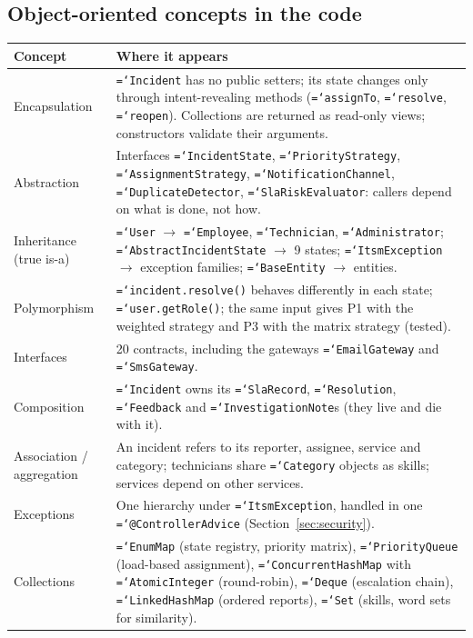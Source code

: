 \documentclass[11pt,a4paper]{article}
\newcommand{\code}[1]{\texttt{\hyphenchar\font=`\-\relax #1}}
\begin{document}
\subsection{Object-oriented concepts in the code}
\begin{longtable}{@{}L{3.1cm}L{12.1cm}@{}}
\toprule
\textbf{Concept} & \textbf{Where it appears} \\
\midrule\endhead
Encapsulation & \code{Incident} has no public setters; its state changes only through intent-revealing methods (\code{assignTo}, \code{resolve}, \code{reopen}). Collections are returned as read-only views; constructors validate their arguments. \\
Abstraction & Interfaces \code{IncidentState}, \code{PriorityStrategy}, \code{AssignmentStrategy}, \code{NotificationChannel}, \code{DuplicateDetector}, \code{SlaRiskEvaluator}: callers depend on what is done, not how. \\
Inheritance (true is-a) & \code{User} $\rightarrow$ \code{Employee}, \code{Technician}, \code{Administrator}; \code{AbstractIncidentState} $\rightarrow$ 9 states; \code{ItsmException} $\rightarrow$ exception families; \code{BaseEntity} $\rightarrow$ entities. \\
Polymorphism & \code{incident.resolve()} behaves differently in each state; \code{user.getRole()}; the same input gives P1 with the weighted strategy and P3 with the matrix strategy (tested). \\
Interfaces & 20 contracts, including the gateways \code{EmailGateway} and \code{SmsGateway}. \\
Composition & \code{Incident} owns its \code{SlaRecord}, \code{Resolution}, \code{Feedback} and \code{InvestigationNote}s (they live and die with it). \\
Association / aggregation & An incident refers to its reporter, assignee, service and category; technicians share \code{Category} objects as skills; services depend on other services. \\
Exceptions & One hierarchy under \code{ItsmException}, handled in one \code{@ControllerAdvice} (Section~\ref{sec:security}). \\
Collections & \code{EnumMap} (state registry, priority matrix), \code{PriorityQueue} (load-based assignment), \code{ConcurrentHashMap} with \code{AtomicInteger} (round-robin), \code{Deque} (escalation chain), \code{LinkedHashMap} (ordered reports), \code{Set} (skills, word sets for similarity). \\
\bottomrule
\end{longtable}
\end{document}
